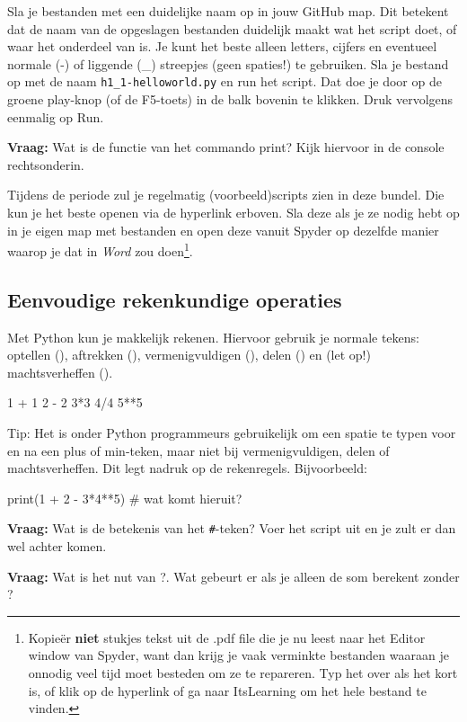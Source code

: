 \documentclass[a4paper,11pt, fleqn]{article}
\begin{document}
Sla je bestanden met een duidelijke naam op in jouw GitHub map. Dit betekent dat de naam van de opgeslagen bestanden duidelijk maakt wat het script doet, of waar het onderdeel van is. Je kunt het beste alleen letters, cijfers en eventueel normale (-) of liggende (\_) streepjes (geen spaties!) te gebruiken. Sla je bestand op met de naam \verb,h1_1-helloworld.py, en run het script.  Dat doe je door op de groene play-knop (of de F5-toets) in de balk bovenin te klikken. Druk vervolgens eenmalig op Run.

{\bf Vraag:} Wat is de functie van het commando print? Kijk hiervoor in de console rechtsonderin.

Tijdens de periode zul je regelmatig (voorbeeld)scripts zien in deze bundel. Die kun je het beste openen via de hyperlink erboven. 
Sla deze als je ze nodig hebt op in je eigen map met bestanden en open deze vanuit Spyder op dezelfde manier waarop je dat in \textit{Word} zou doen\footnote{Kopie\"{e}r \textbf{niet} stukjes tekst uit de .pdf file die je nu leest naar het Editor window van Spyder, want dan krijg je vaak verminkte bestanden waaraan je onnodig veel tijd moet besteden om ze te repareren. Typ het over als het kort is, of klik op de hyperlink of ga naar ItsLearning om het hele bestand te vinden.}.

\subsection{Eenvoudige rekenkundige operaties}
Met Python kun je makkelijk rekenen. Hiervoor gebruik je normale tekens: optellen (\pythoninline{+}), aftrekken (\pythoninline{-}), vermenigvuldigen (\pythoninline{*}), delen (\pythoninline{/}) en (let op!) machtsverheffen (\pythoninline{**}).

\begin{python}
1 + 1
2 - 2
3*3
4/4
5**5
\end{python}

Tip: Het is onder Python programmeurs gebruikelijk om een spatie te typen voor en na een plus of min-teken, maar niet bij vermenigvuldigen, delen of machtsverheffen. Dit legt nadruk op de rekenregels. Bijvoorbeeld: 

\begin{python}
print(1 + 2 - 3*4**5) # wat komt hieruit?
\end{python}
\textbf{Vraag:} Wat is de betekenis van het \verb,#,-teken? Voer het script uit en je zult er dan wel achter komen. 

\textbf{Vraag:} Wat is het nut van ?. Wat gebeurt er als je alleen de som berekent zonder ?
\end{document}
